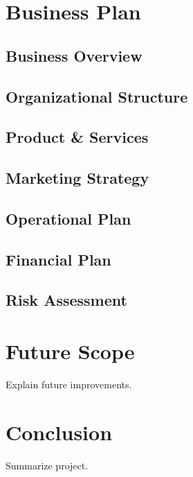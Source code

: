 \documentclass[12pt,a4paper]{report}
\begin{document}
\chapter{Business Plan}
\section{Business Overview}
\section{Organizational Structure}
\section{Product \& Services}
\section{Marketing Strategy}
\section{Operational Plan}
\section{Financial Plan}
\section{Risk Assessment}

\chapter{Future Scope}
Explain future improvements.

\chapter{Conclusion}
Summarize project.
\end{document}
